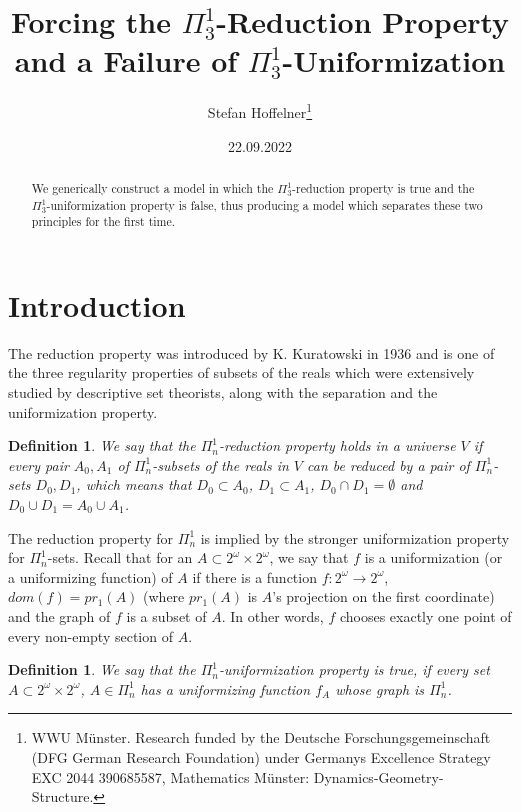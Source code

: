 \documentclass[a4paper,11pt]{article}
\title{Forcing the ${\Pi^1_3}$-Reduction Property and a Failure of $\Pi^1_3$-Uniformization}
\author{ Stefan Hoffelner\footnote{ WWU M\"unster. Research funded by the Deutsche Forschungsgemeinschaft (DFG German Research Foundation) under Germanys Excellence Strategy EXC 2044 390685587, Mathematics M\"unster: Dynamics-Geometry-Structure. }}
\date{22.09.2022}
\newtheorem{definition}[theorem]{Definition}
\begin{document}
\maketitle

\begin{abstract}
We generically construct a model in which the $\Pi^1_3$-reduction property is true and the $\Pi^1_3$-uniformization property is false, thus producing a model which separates these two principles for the first time.
\end{abstract}

\section{Introduction}
The reduction property was introduced by K. Kuratowski in 1936 and is one of the three regularity properties of subsets of the reals which were extensively studied by descriptive set theorists, along with the separation and the uniformization property. 
\begin{definition}
We say that the $\Pi^1_n$-reduction property holds in a universe $V$ if every pair $A_0,A_1$ of $\Pi^1_n$-subsets of the reals in $V$ can be reduced by a pair of $\Pi^1_n$-sets $D_0,D_1$, which means that $D_0 \subset A_0$, $D_1 \subset A_1$, $D_0 \cap D_1= \emptyset$ and $D_0 \cup D_1=A_0 \cup A_1$.
\end{definition}
The reduction property for $\Pi^1_n$ is implied by the stronger uniformization property for $\Pi^1_n$-sets.
Recall that for an $A \subset 2^{\omega} \times 2^{\omega}$, we say that $f$ is a uniformization (or a uniformizing function) of
$A$ if there is a function $f: 2^{\omega} \rightarrow 2^{\omega}$, 
$dom(f)= pr_1(A)$ (where $pr_1(A)$ is $A$'s projection on the first coordinate) and the graph of $f$ is a subset of $A$. In other words, $f$ chooses exactly one point of every non-empty section of $A$.

\begin{definition}
 We say that the $\Pi^1_n$-uniformization property is true, if 
every set $A \subset 2^{\omega} \times 2^{\omega}$, $A \in \Pi^1_n$ has a uniformizing function $f_A$ whose graph is $\Pi^1_n$.
\end{definition}
\end{document}
